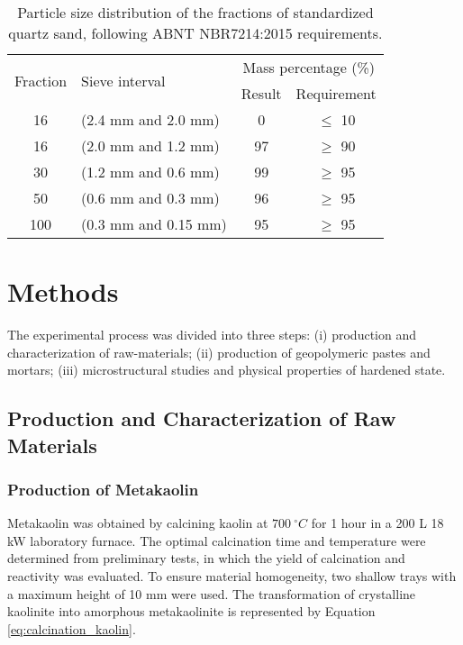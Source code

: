 \begin{table}[H]
    \caption{Particle size distribution of the fractions of standardized quartz sand, following ABNT NBR7214:2015 requirements.}
    \label{tab:quartz_sand_granulometry}
    \centering
    \begin{tabular}{c l c c}
        \hline
        \multirow{2}{*}{Fraction} & \multirow{2}{*}{Sieve interval} & \multicolumn{2}{c}{Mass percentage (\%)} \\ \cline{3-4}       
        & & Result & Requirement\\
        \hline
        16 & (2.4 mm and 2.0 mm) & 0 & $\leq$ 10 \\
        16 & (2.0 mm and 1.2 mm) & 97 & $\geq$ 90 \\
        30 & (1.2 mm and 0.6 mm) & 99 & $\geq$ 95 \\
        50 & (0.6 mm and 0.3 mm) & 96 & $\geq$ 95 \\
        100 & (0.3 mm and 0.15 mm) & 95 & $\geq$ 95 \\
        \hline
    \end{tabular}
\end{table}

\section{Methods}
\label{sec:methods}
The experimental process was divided into three steps: (i) production and characterization of raw-materials; (ii) production of geopolymeric pastes and mortars; (iii) microstructural studies and physical properties of hardened state.

\subsection{Production and Characterization of Raw Materials}
\label{sec:production_characterization_raw_materials}

\subsubsection{Production of Metakaolin}
\label{sec:production_of_metakaolin}

Metakaolin was obtained by calcining kaolin at $700\ ^\circ C$ for 1 hour in a 200 L 18 kW laboratory furnace.
The optimal calcination time and temperature were determined from preliminary tests, in which the yield of calcination and reactivity was evaluated.
To ensure material homogeneity, two shallow trays with a maximum height of 10 mm were used.
The transformation of crystalline kaolinite into amorphous metakaolinite is represented by Equation \ref{eq:calcination_kaolin}.

